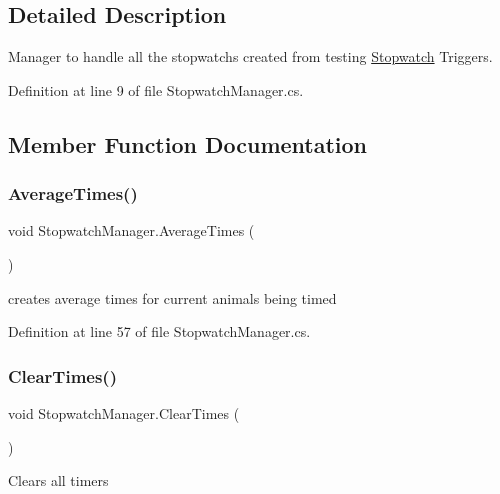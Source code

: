 \subsection{Detailed Description}
Manager to handle all the stopwatchs created from testing \mbox{\hyperlink{class_stopwatch}{Stopwatch}} Triggers. 



Definition at line 9 of file Stopwatch\+Manager.\+cs.



\subsection{Member Function Documentation}
\mbox{\label{class_stopwatch_manager_a685b366b8d26cbb98105ad494c398063}} 
\subsubsection{\texorpdfstring{Average\+Times()}{AverageTimes()}}
{\footnotesize\ttfamily void Stopwatch\+Manager.\+Average\+Times (\begin{DoxyParamCaption}{ }\end{DoxyParamCaption})}



creates average times for current animals being timed 



Definition at line 57 of file Stopwatch\+Manager.\+cs.

\mbox{\label{class_stopwatch_manager_acfac0cb9d7a772f03090bb9b67a4a0e0}} 
\subsubsection{\texorpdfstring{Clear\+Times()}{ClearTimes()}}
{\footnotesize\ttfamily void Stopwatch\+Manager.\+Clear\+Times (\begin{DoxyParamCaption}{ }\end{DoxyParamCaption})}



Clears all timers 



